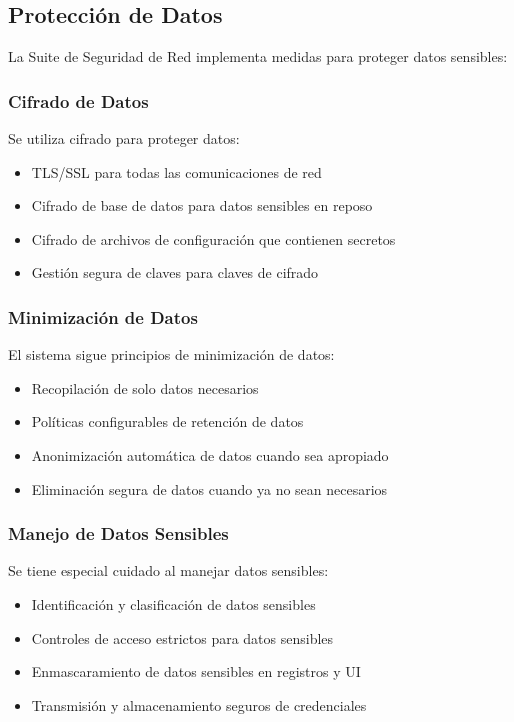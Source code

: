 \subsection{Protección de Datos}
La Suite de Seguridad de Red implementa medidas para proteger datos sensibles:

\subsubsection{Cifrado de Datos}
Se utiliza cifrado para proteger datos:

\begin{itemize}
    \item TLS/SSL para todas las comunicaciones de red
    \item Cifrado de base de datos para datos sensibles en reposo
    \item Cifrado de archivos de configuración que contienen secretos
    \item Gestión segura de claves para claves de cifrado
\end{itemize}

\subsubsection{Minimización de Datos}
El sistema sigue principios de minimización de datos:

\begin{itemize}
    \item Recopilación de solo datos necesarios
    \item Políticas configurables de retención de datos
    \item Anonimización automática de datos cuando sea apropiado
    \item Eliminación segura de datos cuando ya no sean necesarios
\end{itemize}

\subsubsection{Manejo de Datos Sensibles}
Se tiene especial cuidado al manejar datos sensibles:

\begin{itemize}
    \item Identificación y clasificación de datos sensibles
    \item Controles de acceso estrictos para datos sensibles
    \item Enmascaramiento de datos sensibles en registros y UI
    \item Transmisión y almacenamiento seguros de credenciales
\end{itemize}

